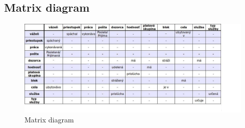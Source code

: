 \documentclass[slovak, 12pt, Times New Roman]{article}
\begin{document}
		\subsection{Matrix diagram}
			\begin{figure}[!htb]
				\centering
				\includegraphics[scale=0.45]{matrixDia.png}
				\caption{Matrix diagram}
				\label{fig:Reinforcement}
			\end{figure}
\end{document}
